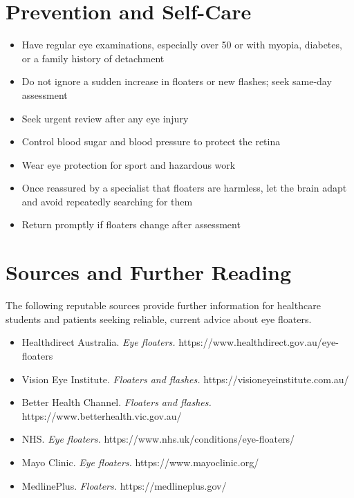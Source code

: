 \section*{Prevention and Self-Care}
\begin{itemize}
    \item Have regular eye examinations, especially over 50 or with myopia, diabetes, or a family history of detachment
    \item Do not ignore a sudden increase in floaters or new flashes; seek same-day assessment
    \item Seek urgent review after any eye injury
    \item Control blood sugar and blood pressure to protect the retina
    \item Wear eye protection for sport and hazardous work
    \item Once reassured by a specialist that floaters are harmless, let the brain adapt and avoid repeatedly searching for them
    \item Return promptly if floaters change after assessment
\end{itemize}

\section*{Sources and Further Reading}
The following reputable sources provide further information for healthcare students and patients seeking reliable, current advice about eye floaters.
\begin{itemize}
    \item Healthdirect Australia. \textit{Eye floaters.} https://www.healthdirect.gov.au/eye-floaters
    \item Vision Eye Institute. \textit{Floaters and flashes.} https://visioneyeinstitute.com.au/
    \item Better Health Channel. \textit{Floaters and flashes.} https://www.betterhealth.vic.gov.au/
    \item NHS. \textit{Eye floaters.} https://www.nhs.uk/conditions/eye-floaters/
    \item Mayo Clinic. \textit{Eye floaters.} https://www.mayoclinic.org/
    \item MedlinePlus. \textit{Floaters.} https://medlineplus.gov/
\end{itemize}
